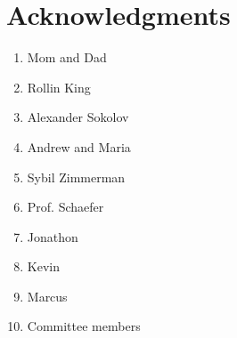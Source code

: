 \chapter*{Acknowledgments}

\begin{enumerate}
    \item
        Mom and Dad
    \item
        Rollin King
    \item
        Alexander Sokolov
    \item
        Andrew and Maria
    \item
        Sybil Zimmerman
    \item
        Prof. Schaefer
    \item
        Jonathon
    \item
        Kevin
    \item
        Marcus
    \item
        Committee members
\end{enumerate}
